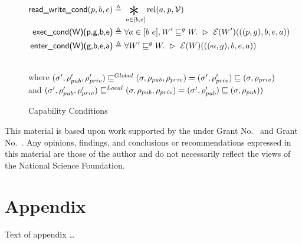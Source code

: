 \documentclass[sigplan,review,anonymous]{acmart}\settopmatter{printfolios=true,printccs=false,printacmref=false}
\newcommand{\bigsep}{\mathop{\scalebox{2.5}{\raisebox{-0.4ex}{$*$}}}}%
\newcommand{\interp}[2]{(#1)(#2)}
\begin{document}
\begin{figure*}[ht]
	\begin{minipage}{\textwidth}
	\begin{align*}
 		\textsf{read\_write\_cond}(p,b,e) \triangleq&~\bigsep_{a \in [b,e]} \text{rel}(a,p,\mathcal{V})\\
 		\textsf{exec\_cond(W)(p,g,b,e)} \triangleq&~\forall a \in [b~e], W' \sqsubseteq^g W.~\rhd~\mathcal{E}\interp{W'}{((p,g),b,e,a)}\\
 		\textsf{enter\_cond(W)(g,b,e,a)} \triangleq&~\forall W' \sqsubseteq^g W.~\rhd~\mathcal{E}\interp{W}{((\textsf{\tiny{RX}},g),b,e,a)}
	\end{align*}
	\end{minipage}
	\\[2em]
	where $(\sigma',\rho_{pub}',\rho_{priv}') \sqsubseteq^{\tiny Global} (\sigma,\rho_{pub},\rho_{priv}) = (\sigma',\rho_{priv}') \sqsubseteq (\sigma,\rho_{priv})$\\ and 
	$(\sigma',\rho_{pub}',\rho_{priv}') \sqsubseteq^{\tiny Local} (\sigma,\rho_{pub},\rho_{priv}) = (\sigma',\rho_{pub}') \sqsubseteq (\sigma,\rho_{pub}))$
	
	\label{fig:condition}
	\caption{Capability Conditions}
\end{figure*}


\begin{acks}                            %
  This material is based upon work supported by the
   under Grant
  No.~ and Grant
  No.~.  Any opinions, findings, and
  conclusions or recommendations expressed in this material are those
  of the author and do not necessarily reflect the views of the
  National Science Foundation.
\end{acks}


%


\appendix
\section{Appendix}

Text of appendix \ldots
\end{document}

